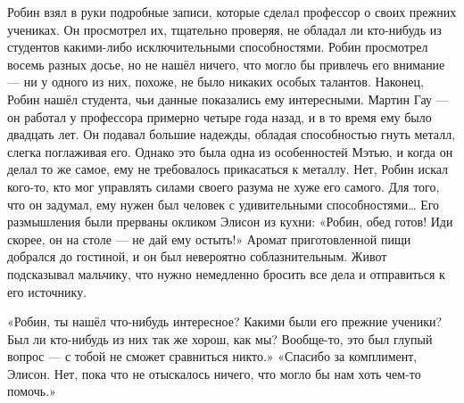 \documentclass[a4paper,12pt]{book}
\begin{document}
	Робин взял в руки подробные записи, которые сделал профессор о своих прежних учениках. Он просмотрел их, тщательно проверяя, не обладал ли кто-нибудь из студентов какими-либо исключительными способностями. Робин просмотрел восемь разных досье, но не нашёл ничего, что могло бы привлечь его внимание — ни у одного из них, похоже, не было никаких особых талантов.
	Наконец, Робин нашёл студента, чьи данные показались ему интересными. Мартин Гау — он работал у профессора примерно четыре года назад, и в то время ему было двадцать лет. Он подавал большие надежды, обладая способностью гнуть металл, слегка поглаживая его. Однако это была одна из особенностей Мэтью, и когда он делал то же самое, ему не требовалось прикасаться к металлу.
	Нет, Робин искал кого-то, кто мог управлять силами своего разума не хуже его самого. Для того, что он задумал, ему нужен был человек с удивительными способностями…
	Его размышления были прерваны окликом Элисон из кухни:
	«Робин, обед готов! Иди скорее, он на столе — не дай ему остыть!»
	Аромат приготовленной пищи добрался до гостиной, и он был невероятно соблазнительным. Живот подсказывал мальчику, что нужно немедленно бросить все дела и отправиться к его источнику.

	«Робин, ты нашёл что-нибудь интересное? Какими были его прежние ученики? Был ли кто-нибудь из них так же хорош, как мы? Вообще-то, это был глупый вопрос — с тобой не сможет сравниться никто.»
	«Спасибо за комплимент, Элисон. Нет, пока что не отыскалось ничего, что могло бы нам хоть чем-то помочь.»
\end{document}
